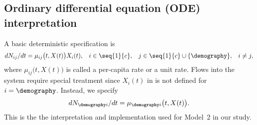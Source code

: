 \subsection{Ordinary differential equation (ODE) interpretation}
\label{subsec:ode}

A basic deterministic specification is
\begin{equation}
\label{eq:ode1}
dN_{ij}/dt = \mu_{ij}\big(t,X(t) \big) X_i(t), \hspace{3mm} i\in \seq{1}{c}, \hspace{3mm} j\in \seq{1}{c} \cup\{\demography\}, \hspace{3mm} i\neq j,
\end{equation}
where $\mu_{ij}\big(t,X(t)\big)$ is called a per-capita rate or a unit rate.
Flows into the system require special treatment since $X_i(t)$ in  is not defined for $i=\demography$.
Instead, we specify
\begin{equation}
\label{eq:ode2}
dN_{\demography i}/dt = \mu_{\demography i}\big(t,X(t) \big).
\end{equation}
This is the the interpretation and implementation used for Model~2 in our study.

